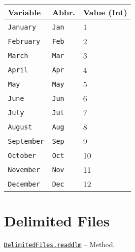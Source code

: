 \begin{table}[h]

\begin{tabulary}{\linewidth}{|L|L|L|}
\hline
Variable & Abbr. & Value (Int) \\
\hline
\texttt{January} & \texttt{Jan} & 1 \\
\hline
\texttt{February} & \texttt{Feb} & 2 \\
\hline
\texttt{March} & \texttt{Mar} & 3 \\
\hline
\texttt{April} & \texttt{Apr} & 4 \\
\hline
\texttt{May} & \texttt{May} & 5 \\
\hline
\texttt{June} & \texttt{Jun} & 6 \\
\hline
\texttt{July} & \texttt{Jul} & 7 \\
\hline
\texttt{August} & \texttt{Aug} & 8 \\
\hline
\texttt{September} & \texttt{Sep} & 9 \\
\hline
\texttt{October} & \texttt{Oct} & 10 \\
\hline
\texttt{November} & \texttt{Nov} & 11 \\
\hline
\texttt{December} & \texttt{Dec} & 12 \\
\hline
\end{tabulary}

\end{table}





\hypertarget{10558358273479705126}{}


\chapter{Delimited Files}


\hypertarget{16037077475059757878}{} 
\hyperlink{16037077475059757878}{\texttt{DelimitedFiles.readdlm}}  -- {Method.}

